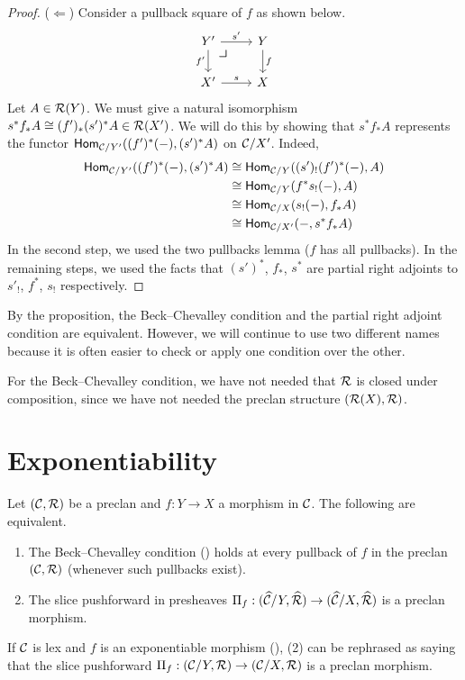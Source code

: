 \begin{proof}
  ($\Leftarrow$)
  Consider a pullback square of $f$ as shown below.
  \[
    \begin{tikzcd}
      Y' \ar[r, "s'"] \ar[d, "f'"'] \pbcorner & Y \ar[d, "f"] \\
      X' \ar[r, "s"] & X
    \end{tikzcd}
  \]
  Let $A \in \mathcal{R}(Y)$.
  We must give a natural isomorphism $s^* f_* A \cong (f')_* (s')^* A \in \mathcal{R}(X')$.
  We will do this by showing that $s^* f_* A$ represents
  the functor $\mathsf{Hom}_{\mathcal{C}/Y'}((f')^*(-), (s')^*A)$ on $\mathcal{C}/X'$.
  Indeed,
  \begin{align*}
    \mathsf{Hom}_{\mathcal{C}/Y'}((f')^*(-), (s')^*A)
    & \cong \mathsf{Hom}_{\mathcal{C}/Y}((s')_!(f')^*(-), A) \\
    & \cong \mathsf{Hom}_{\mathcal{C}/Y}(f^* s_!(-), A) \\
    & \cong \mathsf{Hom}_{\mathcal{C}/X}(s_!(-), f_* A) \\
    & \cong \mathsf{Hom}_{\mathcal{C}/X'}({-}, s^* f_* A)
  \end{align*}
  In the second step, we used the two pullbacks lemma
  ($f$ has all pullbacks).
  In the remaining steps, we used the facts that
  $(s')^*$, $f_*$, $s^*$ are partial right adjoints
  to $s'_!$, $f^*$, $s_!$ respectively.
\end{proof}

By the proposition, the Beck--Chevalley condition and the partial right adjoint condition
are equivalent.
However, we will continue to use two different names
because it is often easier
to check or apply one condition over the other.

\begin{remark}
  For the Beck--Chevalley condition,
  we have not needed that $\mathcal{R}$ is closed under composition,
  since we have not needed the preclan structure $(\mathcal{R}(X),\mathcal{R})$.
\end{remark}

\section{Exponentiability}
\begin{theorem} \label{theorem:exponentiable}
  Let $(\mathcal{C},\mathcal{R})$ be a preclan and $f : Y \to X$ a morphism in $\mathcal{C}$.
  The following are equivalent.
  \begin{enumerate}
  \item
    The Beck--Chevalley condition ()
    holds at every pullback of $f$ in the preclan $(\mathcal{C},\mathcal{R})$
    (whenever such pullbacks exist).
  \item
    The slice pushforward in presheaves $\Pi_f : (\widehat{\mathcal{C}}/Y, \widehat{\mathcal{R}}) \to (\widehat{\mathcal{C}}/X, \widehat{\mathcal{R}})$
    is a preclan morphism.
  \end{enumerate}
  
  If $\mathcal{C}$ is lex and $f$ is an exponentiable morphism
  (),
  (2) can be rephrased as saying that
  the slice pushforward $\Pi_f : (\mathcal{C}/Y, \mathcal{R}) \to (\mathcal{C}/X, \mathcal{R})$ is a preclan morphism.
\end{theorem}

